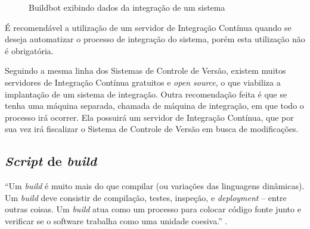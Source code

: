 \begin{figure}[ht]
    \centering
    \caption{Buildbot exibindo dados da integração de um sistema}
    \label{buildbot}
\end{figure}

É recomendável a utilização de um servidor de Integração Contínua quando se deseja automatizar o processo de integração do sistema, porém esta utilização não é obrigatória.

Seguindo a mesma linha dos Sistemas de Controle de Versão, existem muitos servidores de Integração Contínua gratuitos e \textit{open source}, o que viabiliza a implantação de um sistema de integração. Outra recomendação feita é que se tenha uma máquina separada, chamada de máquina de integração, em que todo o processo irá ocorrer. Ela possuirá um servidor de Integração Contínua, que por sua vez irá fiscalizar o Sistema de Controle de Versão em busca de modificações.

\subsection{\textit{Script} de \textit{build}}

``Um \textit{build} é muito mais do que compilar (ou variações das linguagens dinâmicas). Um \textit{build} deve consistir de compilação, testes, inspeção, e \textit{deployment} – entre outras coisas. Um \textit{build} atua como um processo para colocar código fonte junto e verificar se o software trabalha como uma unidade coesiva.'' \cite{DUVALL}.

